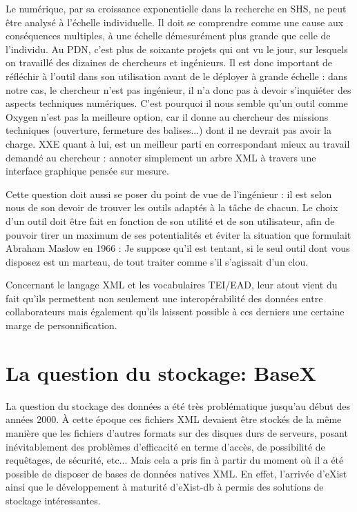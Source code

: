 \documentclass[a4paper,12pt,twoside]{book}
\begin{document}
    
    Le numérique, par sa croissance exponentielle dans la recherche en SHS, ne peut être analysé à l'échelle individuelle. Il doit se comprendre comme une cause aux conséquences multiples, à une échelle démesurément plus grande que celle de l'individu. Au \acrshort{PDN}, c'est plus de soixante projets qui ont vu le jour, sur lesquels on travaillé des dizaines de chercheurs et ingénieurs. Il est donc important de réfléchir à l'outil dans son utilisation avant de le déployer à grande échelle : dans notre cas, le chercheur n'est pas ingénieur, il n'a donc pas à devoir s'inquiéter des aspects techniques numériques. C'est pourquoi il nous semble qu'un outil comme Oxygen n'est pas la meilleure option, car il donne au chercheur des missions techniques (ouverture, fermeture des balises...) dont il ne devrait pas avoir la charge. \acrshort{XXE} quant à lui, est un meilleur parti en correspondant mieux au travail demandé au chercheur : annoter simplement un arbre \acrshort{XML} à travers une interface graphique pensée sur mesure.
    
    Cette question doit aussi se poser du point de vue de l'ingénieur : il est selon nous de son devoir de trouver les outils adaptés à la tâche de chacun. Le choix d'un outil doit être fait en fonction de son utilité et de son utilisateur, afin de pouvoir tirer un maximum de ses potentialités et éviter la situation que formulait Abraham Maslow en 1966 : \og Je suppose qu'il est tentant, si le seul outil dont vous disposez est un marteau, de tout traiter comme s'il s'agissait d'un clou.\fg
    
    Concernant le langage XML et les vocabulaires TEI/EAD, leur atout vient du fait qu'ils permettent non seulement une interopérabilité des données entre collaborateurs mais également qu'ils laissent possible à ces derniers une certaine marge de personnification.
    
    \section{La question du stockage: BaseX\label{basex}}
    
    La question du stockage des données a été très problématique jusqu'au début des années 2000. À cette époque ces fichiers \acrshort{XML} devaient être stockés de la même manière que les fichiers d'autres formats sur des disques durs de serveurs, posant inévitablement des problèmes d'efficacité en terme d'accès, de possibilité de requêtages, de sécurité, etc... Mais cela a pris fin à partir du moment où il a été possible de disposer de bases de données natives \acrshort{XML}. En effet, l'arrivée d'eXist ainsi que le développement à maturité d'eXist-db à permis des solutions de stockage intéressantes. 
    
\end{document}
